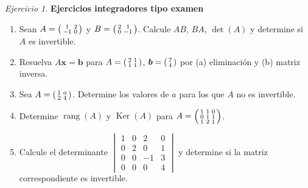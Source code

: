 \documentclass[12pt]{article}
\theoremstyle{remark}
\newtheorem{Ejer}[definicion]{Ejercicio}
\newcommand{\rang}{\operatorname{rang}}
\newcommand{\Ker}{\operatorname{Ker}}
\newcommand{\vect}[1]{\boldsymbol{#1}}
\begin{document}
\begin{Ejer}
\textbf{Ejercicios integradores tipo examen}
\begin{enumerate}[start=30]
\item Sean $A=\begin{psmallmatrix}1&2\\-1&0\end{psmallmatrix}$ y $B=\begin{psmallmatrix}2&1\\0&-1\end{psmallmatrix}$. Calcule $AB$, $BA$, $\det(A)$ y determine si $A$ es invertible.
\item Resuelva $A\vect x=\vect b$ para $A=\begin{psmallmatrix}2&1\\1&1\end{psmallmatrix}$, $\vect b=\begin{psmallmatrix}7\\4\end{psmallmatrix}$ por (a) eliminación y (b) matriz inversa.
\item Sea $A=\begin{psmallmatrix}1&a\\2&4\end{psmallmatrix}$. Determine los valores de $a$ para los que $A$ no es invertible.
\item Determine $\rang(A)$ y $\Ker(A)$ para $A=\begin{psmallmatrix}1&1&0\\0&1&1\\1&2&1\end{psmallmatrix}$.
\item Calcule el determinante $\begin{vmatrix}1&0&2&0\\0&2&0&1\\0&0&-1&3\\0&0&0&4\end{vmatrix}$ y determine si la matriz correspondiente es invertible.
\end{enumerate}
\end{Ejer}
\end{document}

